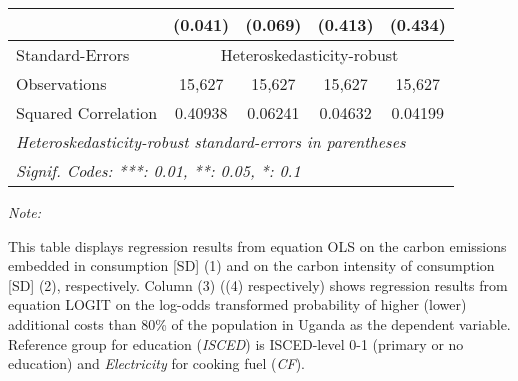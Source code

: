 \begin{table}[htbp!]
\begin{adjustbox}{width = 1\textwidth, max height = 0.95\textheight, center}
\begin{threeparttable}[b]
\begin{tabular}{lcccc}
                                 & (0.041)            & (0.069)            & (0.413)        & (0.434)\\   
            \midrule 
            Standard-Errors & \multicolumn{4}{c}{Heteroskedasticity-robust} \\ 
            Observations         & 15,627             & 15,627             & 15,627         & 15,627\\  
            Squared Correlation  & 0.40938            & 0.06241            & 0.04632        & 0.04199\\  
            \midrule \midrule
            \multicolumn{5}{l}{\emph{Heteroskedasticity-robust standard-errors in parentheses}}\\
            \multicolumn{5}{l}{\emph{Signif. Codes: ***: 0.01, **: 0.05, *: 0.1}}\\
         \end{tabular}
         
         \begin{tablenotes}\item \medskip \textit{Note:}
            \item This table displays regression results from equation OLS on the carbon emissions embedded in consumption [SD] (1) and on the carbon intensity of consumption [SD] (2), respectively. 
                                      Column (3) ((4) respectively) shows regression results from equation LOGIT on the log-odds transformed probability of higher (lower) additional costs than 80\% of the population in Uganda as the dependent variable. Reference group for education (\textit{ISCED}) is ISCED-level 0-1 (primary or no education) and \textit{Electricity} for cooking fuel (\textit{CF}).
         \end{tablenotes}
      \end{threeparttable}
   \end{adjustbox}
\end{table}


